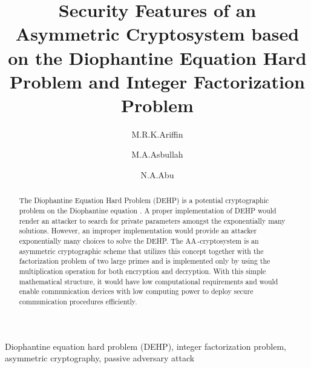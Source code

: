 \documentclass{llncs}
\begin{document}
\title{Security Features of an Asymmetric Cryptosystem based on the Diophantine Equation Hard Problem and Integer Factorization Problem}

\author{M.R.K.Ariffin  \and M.A.Asbullah  \and  N.A.Abu}

\maketitle

\begin{abstract}
\noindent The Diophantine Equation Hard Problem (DEHP) is a
potential cryptographic problem on the Diophantine equation
. A proper implementation of
DEHP would render an attacker to search for private parameters
amongst the exponentially many solutions. However, an improper
implementation would provide an attacker exponentially many
choices to solve the DEHP. The AA\,-cryptosystem is an
asymmetric cryptographic scheme that utilizes this concept
together with the factorization problem of two large primes and is
implemented only by using the multiplication operation for both
encryption and decryption. With this simple mathematical
structure, it would have low computational requirements and would
enable communication devices with low computing power to deploy
secure communication procedures efficiently.
\end{abstract}

\begin{keywords}{Diophantine equation hard problem (DEHP), integer factorization problem, asymmetric cryptography, passive adversary
attack} \end{keywords}


\let\thefootnote\relax{}
\end{document}
